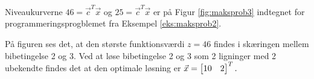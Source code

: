 \begin{eks}
Niveaukurverne $46=\vec{c}^T \vec{x}$ og $25=\vec{c}^T \vec{x}$ er på Figur \ref{fig:maksprob3} indtegnet for programmeringsprogblemet fra Eksempel \ref{eks:maksprob2}.

	\begin{center}	
		
		\label{fig:maksprob3}
	\end{center}
	
På figuren ses det, at den største funktionsværdi $z=46$ findes i skæringen mellem bibetingelse 2 og 3.
Ved at løse bibetingelse 2 og 3 som 2 ligninger med 2 ubekendte findes det at den optimale løsning er $\vec{x}=\begin{bmatrix} 10 & 2 \end{bmatrix}^T.$
\label{eks:maksprob3}
\end{eks}





